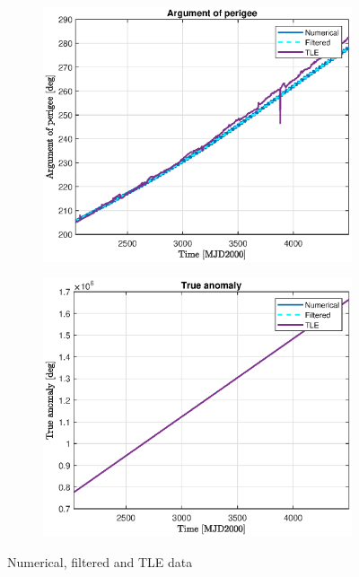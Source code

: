 \documentclass{article}
\begin{document}
\begin{figure}[H]
	\vspace{1cm} %
	\begin{subfigure}[b]{0.45\textwidth}
		\includegraphics[width=\textwidth]{w_TLE.eps}
		\caption{}
		\label{fig:1c}
	\end{subfigure}%
	\hfill
	\begin{subfigure}[b]{0.45\textwidth}
		\includegraphics[width=\textwidth]{TA_TLE.eps}
		\caption{}
		\label{fig:1d}
	\end{subfigure}
	
	\caption{Numerical, filtered and TLE data
	}
\end{figure}



	
\end{document}
